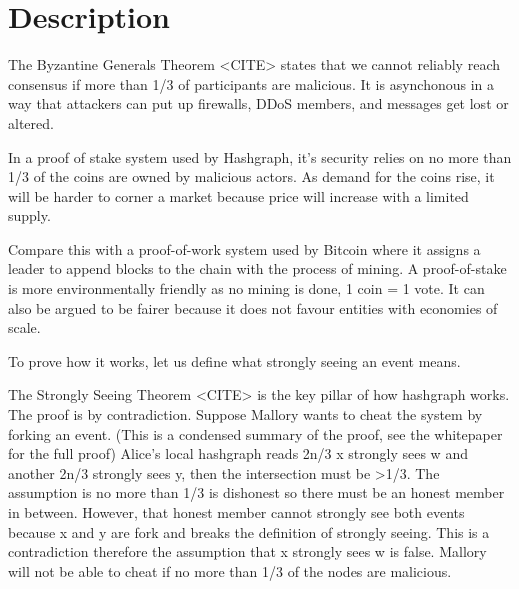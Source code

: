 \section{Description}

The Byzantine Generals Theorem <CITE> states that we cannot reliably reach consensus if more than 1/3 of participants are malicious. It is asynchonous in a way that attackers can put up firewalls, DDoS members, and messages get lost or altered.

In a proof of stake system used by Hashgraph, it's security relies on no more than 1/3 of the coins are owned by malicious actors. As demand for the coins rise, it will be harder to corner a market because price will increase with a limited supply.

Compare this with a proof-of-work system used by Bitcoin where it assigns a leader to append blocks to the chain with the process of mining. A proof-of-stake is more environmentally friendly as no mining is done, 1 coin = 1 vote. It can also be argued to be fairer because it does not favour entities with economies of scale.

To prove how it works, let us define what strongly seeing an event means.

The Strongly Seeing Theorem <CITE> is the key pillar of how hashgraph works. The proof is by contradiction. Suppose Mallory wants to cheat the system by forking an event. (This is a condensed summary of the proof, see the whitepaper for the full proof) Alice's local hashgraph reads 2n/3 x strongly sees w and another 2n/3 strongly sees y, then the intersection must be >1/3. The assumption is no more than 1/3 is dishonest so there must be an honest member in between. However, that honest member cannot strongly see both events because x and y are fork and breaks the definition of strongly seeing. This is a contradiction therefore the assumption that x strongly sees w is false. Mallory will not be able to cheat if no more than 1/3 of the nodes are malicious.
